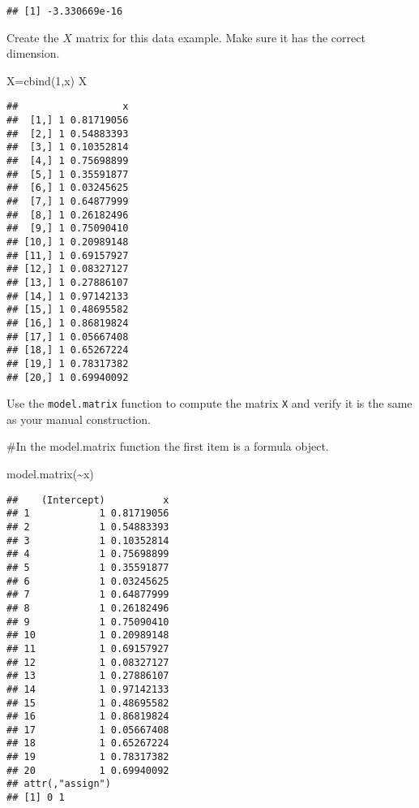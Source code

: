 \documentclass[
]{article}
\newenvironment{Shaded}{\begin{snugshade}}{\end{snugshade}}
\newcommand{\AttributeTok}[1]{\textcolor[rgb]{0.77,0.63,0.00}{#1}}
\newcommand{\DecValTok}[1]{\textcolor[rgb]{0.00,0.00,0.81}{#1}}
\newcommand{\FloatTok}[1]{\textcolor[rgb]{0.00,0.00,0.81}{#1}}
\newcommand{\FunctionTok}[1]{\textcolor[rgb]{0.00,0.00,0.00}{#1}}
\newcommand{\NormalTok}[1]{#1}
\newcommand{\OtherTok}[1]{\textcolor[rgb]{0.56,0.35,0.01}{#1}}
\newcommand{\SpecialCharTok}[1]{\textcolor[rgb]{0.00,0.00,0.00}{#1}}
\begin{document}
\begin{verbatim}
## [1] -3.330669e-16
\end{verbatim}

\begin{Shaded}
\end{Shaded}

Create the \(X\) matrix for this data example. Make sure it has the
correct dimension.

\begin{Shaded}
\begin{Highlighting}[]
\NormalTok{X}\OtherTok{=}\FunctionTok{cbind}\NormalTok{(}\DecValTok{1}\NormalTok{,x)}
\NormalTok{X}
\end{Highlighting}
\end{Shaded}

\begin{verbatim}
##                  x
##  [1,] 1 0.81719056
##  [2,] 1 0.54883393
##  [3,] 1 0.10352814
##  [4,] 1 0.75698899
##  [5,] 1 0.35591877
##  [6,] 1 0.03245625
##  [7,] 1 0.64877999
##  [8,] 1 0.26182496
##  [9,] 1 0.75090410
## [10,] 1 0.20989148
## [11,] 1 0.69157927
## [12,] 1 0.08327127
## [13,] 1 0.27886107
## [14,] 1 0.97142133
## [15,] 1 0.48695582
## [16,] 1 0.86819824
## [17,] 1 0.05667408
## [18,] 1 0.65267224
## [19,] 1 0.78317382
## [20,] 1 0.69940092
\end{verbatim}

Use the \texttt{model.matrix} function to compute the matrix \texttt{X}
and verify it is the same as your manual construction.

\#In the model.matrix function the first item is a formula object.

\begin{Shaded}
\begin{Highlighting}[]
\FunctionTok{model.matrix}\NormalTok{(}\SpecialCharTok{\textasciitilde{}}\NormalTok{x)}
\end{Highlighting}
\end{Shaded}

\begin{verbatim}
##    (Intercept)          x
## 1            1 0.81719056
## 2            1 0.54883393
## 3            1 0.10352814
## 4            1 0.75698899
## 5            1 0.35591877
## 6            1 0.03245625
## 7            1 0.64877999
## 8            1 0.26182496
## 9            1 0.75090410
## 10           1 0.20989148
## 11           1 0.69157927
## 12           1 0.08327127
## 13           1 0.27886107
## 14           1 0.97142133
## 15           1 0.48695582
## 16           1 0.86819824
## 17           1 0.05667408
## 18           1 0.65267224
## 19           1 0.78317382
## 20           1 0.69940092
## attr(,"assign")
## [1] 0 1
\end{verbatim}
\end{document}
